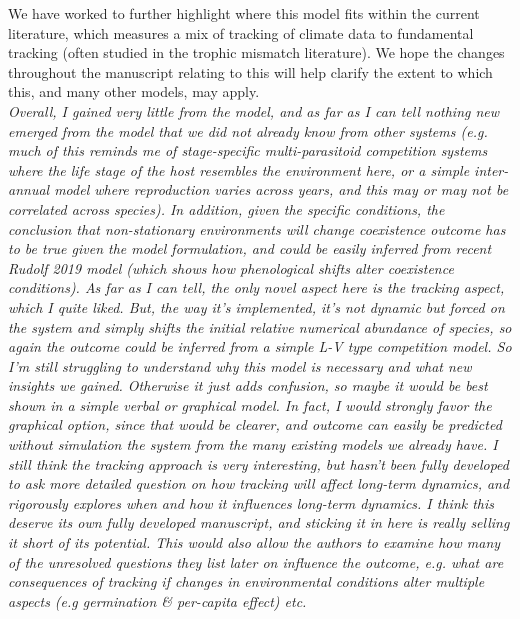 \documentclass[11pt]{article}
\begin{document}
We have worked to further highlight where this model fits within the current literature, which measures a mix of tracking of climate data to fundamental tracking (often studied in the trophic mismatch literature). We hope the changes throughout the manuscript relating to this will help clarify the extent to which this, and many other models, may apply.\\

\emph{Overall, I gained very little from the model, and as far as I can tell nothing new emerged
from the model that we did not already know from other systems (e.g.  much of this reminds me
of stage-specific multi-parasitoid competition systems where the life stage of the host
resembles the environment here, or a simple inter-annual model where reproduction varies
across years, and this may or may not be correlated across species). In addition, given the
specific conditions, the conclusion that non-stationary environments will change coexistence
outcome has to be true given the model formulation, and could be easily inferred from recent
Rudolf 2019 model (which shows how phenological shifts alter coexistence conditions).
As far as I can tell, the only novel aspect here is the tracking aspect, which I quite liked.
But, the way it's implemented, it's not dynamic but forced on the system and simply shifts
the initial relative numerical abundance of species, so again the outcome could be inferred
from a simple L-V type competition model. So I'm still struggling to understand why this
model is necessary and what new insights we gained. Otherwise it just adds confusion, so
maybe it would be best shown in a simple verbal or graphical model. In fact, I would strongly
favor the graphical option, since that would be clearer, and outcome can easily be predicted
without simulation the system from the many existing models we already have. I still think
the tracking approach is very interesting, but hasn't been fully developed to ask more
detailed question on how tracking will affect long-term dynamics, and rigorously explores
when and how it influences long-term dynamics. I think this deserve its own fully developed
manuscript, and sticking it in here is really selling it short of its potential. This would
also allow the authors to examine how many of the unresolved questions they list later on
influence the outcome, e.g. what are consequences of tracking if changes in environmental
conditions alter multiple aspects (e.g germination \& per-capita effect) etc.}\\
\end{document}
